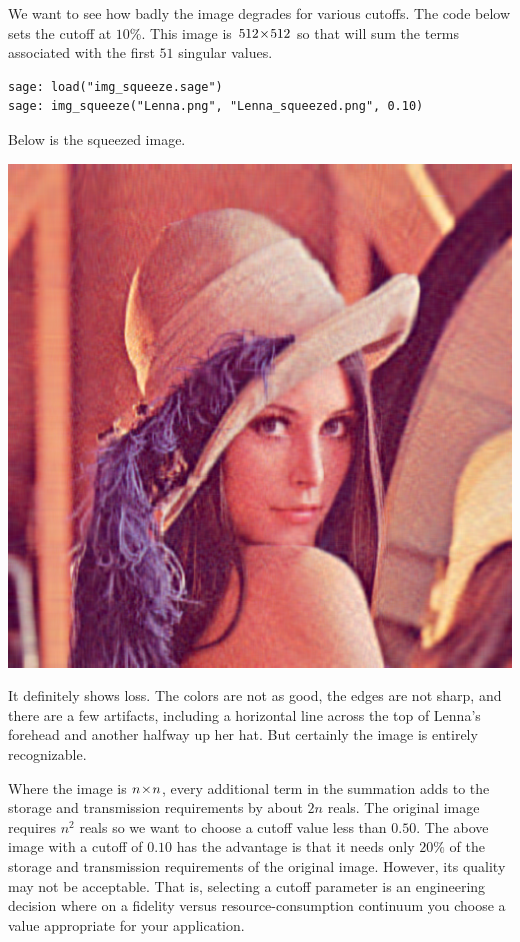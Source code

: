 We want to see how badly the image degrades for various cutoffs.
The code below sets the cutoff at $10$\%.
This image is $512 \! \times \! 512$ so that will sum the terms associated
with the first $51$ singular 
values.
\begin{lstlisting}
sage: load("img_squeeze.sage")                                 
sage: img_squeeze("Lenna.png", "Lenna_squeezed.png", 0.10)
\end{lstlisting}
Below is the squeezed image.
\begin{center}
  \includegraphics[width=.95\textwidth]{Lenna_squeezed.png}
\end{center}
It definitely shows loss.
The colors are not as good, the edges are not sharp, and there are 
a few artifacts, including a horizontal line across the top of 
Lenna's forehead and another halfway up her hat.
But certainly the image is entirely recognizable.

Where the image is $n \! \times \! n$, every additional term in the summation
adds to the storage and transmission requirements by about $2n$ reals.
The original image requires $n^2$ reals so we want to choose a cutoff value 
less than $0.50$.
The above image with a cutoff of $0.10$ has the advantage is that it needs 
only $20\%$ of the storage
and transmission requirements of the original image.
However, its quality may not be acceptable.
That is, selecting a cutoff parameter is an engineering decision where
on a fidelity versus resource-consumption continuum 
you choose a value appropriate for your application.
 
